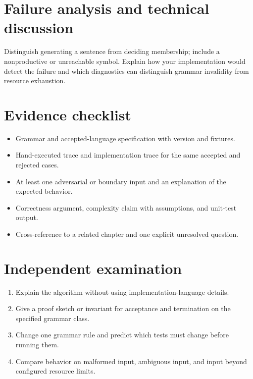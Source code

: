 \documentclass[11pt,letterpaper]{article}
\begin{document}
\section{Failure analysis and technical discussion}
Distinguish generating a sentence from deciding membership; include a nonproductive or unreachable symbol. Explain how your implementation would detect the failure and which diagnostics can distinguish grammar invalidity from resource exhaustion.
\section{Evidence checklist}
\begin{itemize}
\item Grammar and accepted-language specification with version and fixtures.
\item Hand-executed trace and implementation trace for the same accepted and rejected cases.
\item At least one adversarial or boundary input and an explanation of the expected behavior.
\item Correctness argument, complexity claim with assumptions, and unit-test output.
\item Cross-reference to a related chapter and one explicit unresolved question.
\end{itemize}
\section{Independent examination}
\begin{enumerate}
\item Explain the algorithm without using implementation-language details.
\item Give a proof sketch or invariant for acceptance and termination on the specified grammar class.
\item Change one grammar rule and predict which tests must change before running them.
\item Compare behavior on malformed input, ambiguous input, and input beyond configured resource limits.
\end{enumerate}
\end{document}
